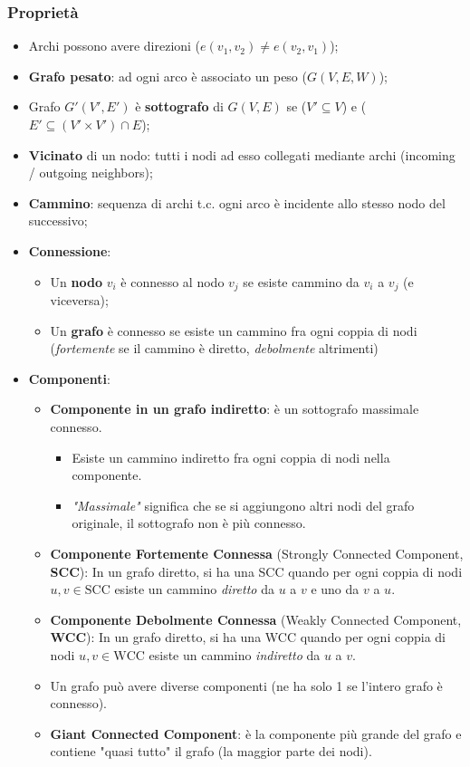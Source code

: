 \documentclass{article}
\begin{document}
    \subsubsection{Proprietà}
      \begin{itemize}
          \item Archi possono avere direzioni ($e(v_1,v_2) \neq e(v_2,v_1)$);
          \item \textbf{Grafo pesato}: ad ogni arco è associato un peso ($G(V,E,W)$);
          \item Grafo $G'(V',E')$ è \textbf{sottografo} di $G(V,E)$ se ($V' \subseteq V$) e ($E' \subseteq (V' \times V') \cap E$);
          \item \textbf{Vicinato} di un nodo: tutti i nodi ad esso collegati mediante archi (incoming / outgoing neighbors);
          \item \textbf{Cammino}: sequenza di archi t.c. ogni arco è incidente allo stesso nodo del successivo;
          \item \textbf{Connessione}:
            \begin{itemize}
                \item Un \textbf{nodo} $v_i$ è connesso al nodo $v_j$ se esiste cammino da $v_i$ a $v_j$ (e viceversa);
                \item Un \textbf{grafo} è connesso se esiste un cammino fra ogni coppia di nodi (\textit{fortemente} se il cammino è diretto, \textit{debolmente} altrimenti)
            \end{itemize}
          \item \textbf{Componenti}:
            \begin{itemize}
                \item \textbf{Componente in un grafo indiretto}: è un sottografo massimale connesso.
                \begin{itemize}
                    \item Esiste un cammino indiretto fra ogni coppia di nodi nella componente.
                    \item \textit{"Massimale"} significa che se si aggiungono altri nodi del grafo originale, il sottografo non è più connesso.
                \end{itemize}
                \item \textbf{Componente Fortemente Connessa} (Strongly Connected Component, \textbf{SCC}): In un grafo diretto, si ha una SCC quando per ogni coppia di nodi $u, v \in \text{SCC}$ esiste un cammino \textit{diretto} da $u$ a $v$ e uno da $v$ a $u$.
                \item \textbf{Componente Debolmente Connessa} (Weakly Connected Component, \textbf{WCC}): In un grafo diretto, si ha una WCC quando per ogni coppia di nodi $u, v \in \text{WCC}$ esiste un cammino \textit{indiretto} da $u$ a $v$.
                \item Un grafo può avere diverse componenti (ne ha solo 1 se l'intero grafo è connesso).
                \item \textbf{Giant Connected Component}: è la componente più grande del grafo e contiene "quasi tutto" il grafo (la maggior parte dei nodi).
            \end{itemize} 
      \end{itemize}
\end{document}
